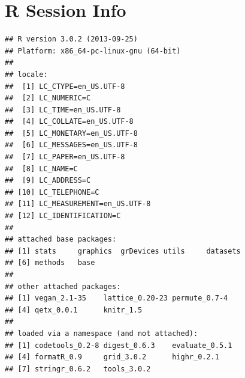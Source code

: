 \documentclass{tufte-book}\usepackage{knitr}
\begin{document}
\backmatter
\appendix

\chapter{R Session Info}
\begin{knitrout}
\color{fgcolor}\begin{kframe}
\begin{alltt}
\hlstd{()}
\end{alltt}
\begin{verbatim}
## R version 3.0.2 (2013-09-25)
## Platform: x86_64-pc-linux-gnu (64-bit)
## 
## locale:
##  [1] LC_CTYPE=en_US.UTF-8      
##  [2] LC_NUMERIC=C              
##  [3] LC_TIME=en_US.UTF-8       
##  [4] LC_COLLATE=en_US.UTF-8    
##  [5] LC_MONETARY=en_US.UTF-8   
##  [6] LC_MESSAGES=en_US.UTF-8   
##  [7] LC_PAPER=en_US.UTF-8      
##  [8] LC_NAME=C                 
##  [9] LC_ADDRESS=C              
## [10] LC_TELEPHONE=C            
## [11] LC_MEASUREMENT=en_US.UTF-8
## [12] LC_IDENTIFICATION=C       
## 
## attached base packages:
## [1] stats     graphics  grDevices utils     datasets 
## [6] methods   base     
## 
## other attached packages:
## [1] vegan_2.1-35    lattice_0.20-23 permute_0.7-4  
## [4] qetx_0.0.1      knitr_1.5      
## 
## loaded via a namespace (and not attached):
## [1] codetools_0.2-8 digest_0.6.3    evaluate_0.5.1 
## [4] formatR_0.9     grid_3.0.2      highr_0.2.1    
## [7] stringr_0.6.2   tools_3.0.2
\end{verbatim}
\end{kframe}
\end{knitrout}




\begin{fullwidth}

\end{fullwidth}

\printindex
\end{document}
